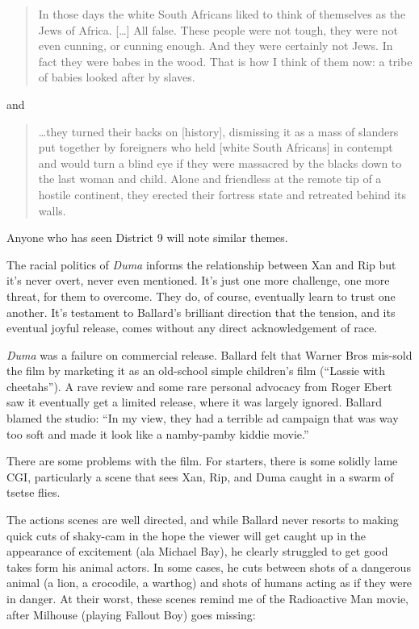 \begin{quote}
  In those days the white South Africans liked to think of themselves as the Jews of Africa. […] All false. These people were not tough, they were not even cunning, or cunning enough. And they were certainly not Jews. In fact they were babes in the wood. That is how I think of them now: a tribe of babies looked after by slaves.
\end{quote}

and

\begin{quote}
  \ldots they turned their backs on [history], dismissing it as a mass of slanders put together by foreigners who held [white South Africans] in contempt and would turn a blind eye if they were massacred by the blacks down to the last woman and child. Alone and friendless at the remote tip of a hostile continent, they erected their fortress state and retreated behind its walls.
\end{quote}

Anyone who has seen District 9 will note similar themes.

The racial politics of \textit{Duma} informs the relationship between Xan and Rip but it's never overt, never even mentioned. It's just one more challenge, one more threat, for them to overcome. They do, of course, eventually learn to trust one another. It's testament to Ballard's brilliant direction that the tension, and its eventual joyful release, comes without any direct acknowledgement of race.

\textit{Duma} was a failure on commercial release. Ballard felt that Warner Bros mis-sold the film by marketing it as an old-school simple children's film (``Lassie with cheetahs''). A rave review and some rare personal advocacy from Roger Ebert saw it eventually get a limited release, where it was largely ignored. Ballard blamed the studio: ``In my view, they had a terrible ad campaign that was way too soft and made it look like a namby-pamby kiddie movie.''

There are some problems with the film. For starters, there is some solidly lame CGI, particularly a scene that sees Xan, Rip, and Duma caught in a swarm of tsetse flies.

The actions scenes are well directed, and while Ballard never resorts to making quick cuts of shaky-cam in the hope the viewer will get caught up in the appearance of excitement (ala Michael Bay), he clearly struggled to get good takes form his animal actors. In some cases, he cuts between shots of a dangerous animal (a lion, a crocodile, a warthog) and shots of humans acting as if they were in danger. At their worst, these scenes remind me of the Radioactive Man movie, after Milhouse (playing Fallout Boy) goes missing:

